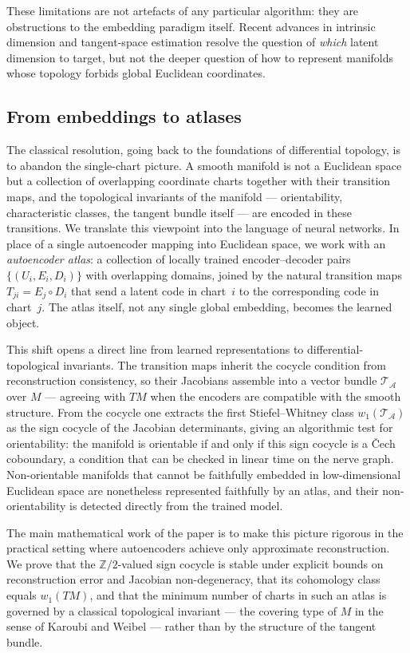 \documentclass[11pt]{article}
\newcommand{\Z}{\mathbb{Z}}
\theoremstyle{plain}
\theoremstyle{definition}
\theoremstyle{remark}
\begin{document}
These limitations are not artefacts of any particular algorithm: they are obstructions to the embedding paradigm itself. Recent advances in intrinsic dimension and tangent-space estimation \cite{doi:10.1137/22M1522711} resolve the question of \emph{which} latent dimension to target, but not the deeper question of how to represent manifolds whose topology forbids global Euclidean coordinates.

\subsection*{From embeddings to atlases}

The classical resolution, going back to the foundations of differential topology, is to abandon the single-chart picture. A smooth manifold is not a Euclidean space but a collection of overlapping coordinate charts together with their transition maps, and the topological invariants of the manifold — orientability, characteristic classes, the tangent bundle itself — are encoded in these transitions. We translate this viewpoint into the language of neural networks. In place of a single autoencoder mapping into Euclidean space, we work with an \emph{autoencoder atlas}: a collection of locally trained encoder--decoder pairs $\{(U_i, E_i, D_i)\}$ with overlapping domains, joined by the natural transition maps $T_{ji} = E_j \circ D_i$ that send a latent code in chart~$i$ to the corresponding code in chart~$j$. The atlas itself, not any single global embedding, becomes the learned object.

This shift opens a direct line from learned representations to differential-topological invariants. The transition maps inherit the cocycle condition from reconstruction consistency, so their Jacobians assemble into a vector bundle $\mathcal{T}_\mathcal{A}$ over $M$ — agreeing with $TM$ when the encoders are compatible with the smooth structure. From the cocycle one extracts the first Stiefel--Whitney class $w_1(\mathcal{T}_\mathcal{A})$ as the sign cocycle of the Jacobian determinants, giving an algorithmic test for orientability: the manifold is orientable if and only if this sign cocycle is a \v{C}ech coboundary, a condition that can be checked in linear time on the nerve graph. Non-orientable manifolds that cannot be faithfully embedded in low-dimensional Euclidean space are nonetheless represented faithfully by an atlas, and their non-orientability is detected directly from the trained model.

The main mathematical work of the paper is to make this picture rigorous in the practical setting where autoencoders achieve only approximate reconstruction. We prove that the $\Z/2$-valued sign cocycle is stable under explicit bounds on reconstruction error and Jacobian non-degeneracy, that its cohomology class equals $w_1(TM)$, and that the minimum number of charts in such an atlas is governed by a classical topological invariant — the covering type of $M$ in the sense of Karoubi and Weibel \cite{Karoubi2017} — rather than by the structure of the tangent bundle.
\end{document}
